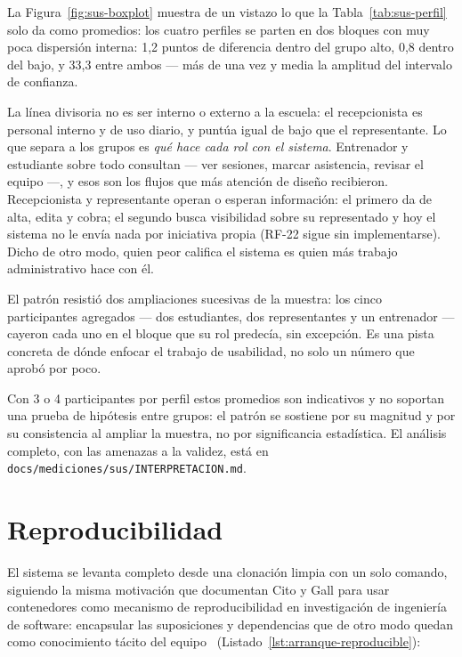 \documentclass[11pt,a4paper]{article}
\newcommand{\ruta}[1]{\texttt{\footnotesize #1}}
\begin{document}
La Figura~\ref{fig:sus-boxplot} muestra de un vistazo lo que la Tabla~\ref{tab:sus-perfil}
solo da como promedios: los cuatro perfiles se parten en dos bloques con muy poca dispersión interna:
1,2 puntos de diferencia dentro del grupo alto, 0,8 dentro del bajo, y 33,3
entre ambos --- más de una vez y media la amplitud del intervalo de confianza.

La línea divisoria no es ser interno o externo a la escuela: el recepcionista
es personal interno y de uso diario, y puntúa igual de bajo que el
representante. Lo que separa a los grupos es \emph{qué hace cada rol con el
sistema}. Entrenador y estudiante sobre todo consultan --- ver sesiones,
marcar asistencia, revisar el equipo ---, y esos son los flujos que más
atención de diseño recibieron. Recepcionista y representante operan o esperan
información: el primero da de alta, edita y cobra; el segundo busca
visibilidad sobre su representado y hoy el sistema no le envía nada por
iniciativa propia (RF-22 sigue sin implementarse). Dicho de otro modo, quien
peor califica el sistema es quien más trabajo administrativo hace con él.

El patrón resistió dos ampliaciones sucesivas de la muestra: los cinco
participantes agregados --- dos estudiantes, dos representantes y un
entrenador --- cayeron cada uno en el bloque que su rol predecía, sin
excepción. Es una pista concreta de dónde enfocar el trabajo de usabilidad,
no solo un número que aprobó por poco.

Con 3 o 4 participantes por perfil estos promedios son indicativos y no
soportan una prueba de hipótesis entre grupos: el patrón se sostiene por su
magnitud y por su consistencia al ampliar la muestra, no por significancia
estadística. El análisis completo, con las amenazas a la validez, está en
\ruta{docs/mediciones/sus/INTERPRETACION.md}.

\section{Reproducibilidad}

El sistema se levanta completo desde una clonación limpia con un solo
comando, siguiendo la misma motivación que documentan Cito y Gall para
usar contenedores como mecanismo de reproducibilidad en investigación
de ingeniería de software: encapsular las suposiciones y dependencias
que de otro modo quedan como conocimiento tácito del
equipo~\cite{citogall2016docker} (Listado~\ref{lst:arranque-reproducible}):
\end{document}
